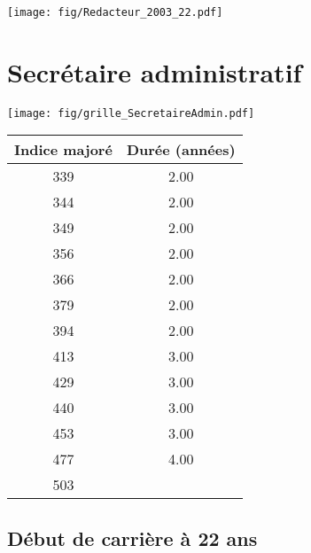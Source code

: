  \vspace{0.1cm} 

 \begin{center}\texttt{[image: fig/Redacteur\_2003\_22.pdf]}\end{center} \label{fig/Redacteur_2003_22.pdf} 

\newpage 
 
\chapter{Secrétaire administratif} 

\begin{minipage}{0.55\linewidth}\texttt{[image: fig/grille\_SecretaireAdmin.pdf]}\end{minipage} 
\begin{minipage}{0.3\linewidth} 
 \begin{center} 

\begin{tabular}[htb]{|c|c|} 
\hline 
 Indice majoré &  Durée (années) \\ 
\hline \hline 
 339 &  2.00 \\ 
\hline 
 344 &  2.00 \\ 
\hline 
 349 &  2.00 \\ 
\hline 
 356 &  2.00 \\ 
\hline 
 366 &  2.00 \\ 
\hline 
 379 &  2.00 \\ 
\hline 
 394 &  2.00 \\ 
\hline 
 413 &  3.00 \\ 
\hline 
 429 &  3.00 \\ 
\hline 
 440 &  3.00 \\ 
\hline 
 453 &  3.00 \\ 
\hline 
 477 &  4.00 \\ 
\hline 
 503 &   \\ 
\hline 
\hline 
\end{tabular} 
\end{center} 
 \end{minipage} 


 \addto{\captionsenglish}{ \renewcommand{\mtctitle}{}} \setcounter{minitocdepth}{2} 
 \minitoc \newpage 

\section{Début de carrière à 22 ans} 

